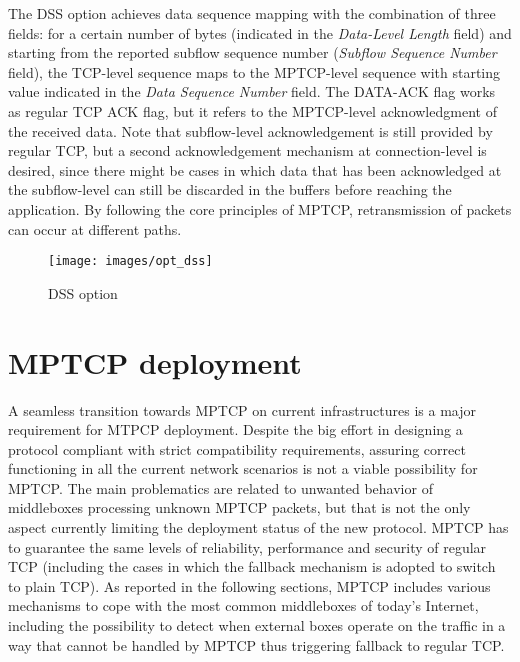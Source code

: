 The DSS option achieves data sequence mapping with the combination of three fields: for a certain number of bytes (indicated in the \textit{Data-Level Length} field) and starting from the reported subflow sequence number (\textit{Subflow Sequence Number} field), the TCP-level sequence maps to the MPTCP-level sequence with starting value indicated in the \textit{Data Sequence Number} field.
The DATA-ACK flag works as regular TCP ACK flag, but it refers to the MPTCP-level acknowledgment of the received data. Note that subflow-level acknowledgement is still provided by regular TCP, but a second acknowledgement mechanism at connection-level is desired, since there might be cases in which data that has been acknowledged at the subflow-level can still be discarded in the buffers before reaching the application. By following the core principles of MPTCP, retransmission of packets can occur at different paths.

\begin{figure}[!htb]
\centering
\texttt{[image: images/opt\_dss]}
\caption{DSS option}
\label{fig:opt_dss}
\end{figure}

\section{MPTCP deployment}
A seamless transition towards MPTCP on current infrastructures is a major requirement for MTPCP deployment.
Despite the big effort in designing a protocol compliant with strict compatibility requirements, assuring correct functioning in all the current network scenarios is not a viable possibility for MPTCP. The main problematics are related to unwanted behavior of middleboxes processing unknown MPTCP packets, but that is not the only aspect currently limiting the deployment status of the new protocol. MPTCP has to guarantee the same levels of reliability, performance and security of regular TCP (including the cases in which the fallback mechanism is adopted to switch to plain TCP). 
As reported in the following sections, MPTCP includes various mechanisms to cope with the most common middleboxes of today's Internet, including the possibility to detect when external boxes operate on the traffic in a way that cannot be handled by MPTCP thus triggering fallback to regular TCP.

